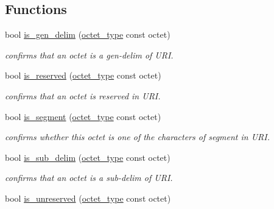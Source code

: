 \subsection*{Functions}
\begin{DoxyCompactItemize}
\item 
\hypertarget{namespacehryky_1_1uri_a5eeaf4345e31b2201835c256b5a1d099}{bool \hyperlink{namespacehryky_1_1uri_a5eeaf4345e31b2201835c256b5a1d099}{is\-\_\-gen\-\_\-delim} (\hyperlink{namespacehryky_a488cba8b666be33ccca70e819684e3c8}{octet\-\_\-type} const octet)}\label{namespacehryky_1_1uri_a5eeaf4345e31b2201835c256b5a1d099}

\begin{DoxyCompactList}\small\item\em confirms that an octet is a gen-\/delim of U\-R\-I. \end{DoxyCompactList}\item 
\hypertarget{namespacehryky_1_1uri_a3051f943d27c6213bba82b8cb8e0b6c5}{bool \hyperlink{namespacehryky_1_1uri_a3051f943d27c6213bba82b8cb8e0b6c5}{is\-\_\-reserved} (\hyperlink{namespacehryky_a488cba8b666be33ccca70e819684e3c8}{octet\-\_\-type} const octet)}\label{namespacehryky_1_1uri_a3051f943d27c6213bba82b8cb8e0b6c5}

\begin{DoxyCompactList}\small\item\em confirms that an octet is reserved in U\-R\-I. \end{DoxyCompactList}\item 
bool \hyperlink{namespacehryky_1_1uri_ab7d939b992c5f913bc116db33e213786}{is\-\_\-segment} (\hyperlink{namespacehryky_a488cba8b666be33ccca70e819684e3c8}{octet\-\_\-type} const octet)
\begin{DoxyCompactList}\small\item\em confirms whether this octet is one of the characters of segment in U\-R\-I. \end{DoxyCompactList}\item 
\hypertarget{namespacehryky_1_1uri_a0f9e547bf72c6148ff436dbffc94651e}{bool \hyperlink{namespacehryky_1_1uri_a0f9e547bf72c6148ff436dbffc94651e}{is\-\_\-sub\-\_\-delim} (\hyperlink{namespacehryky_a488cba8b666be33ccca70e819684e3c8}{octet\-\_\-type} const octet)}\label{namespacehryky_1_1uri_a0f9e547bf72c6148ff436dbffc94651e}

\begin{DoxyCompactList}\small\item\em confirms that an octet is a sub-\/delim of U\-R\-I. \end{DoxyCompactList}\item 
\hypertarget{namespacehryky_1_1uri_a95ad9502034176c355abd2c716d107d3}{bool \hyperlink{namespacehryky_1_1uri_a95ad9502034176c355abd2c716d107d3}{is\-\_\-unreserved} (\hyperlink{namespacehryky_a488cba8b666be33ccca70e819684e3c8}{octet\-\_\-type} const octet)}\label{namespacehryky_1_1uri_a95ad9502034176c355abd2c716d107d3}


\end{DoxyCompactItemize}
